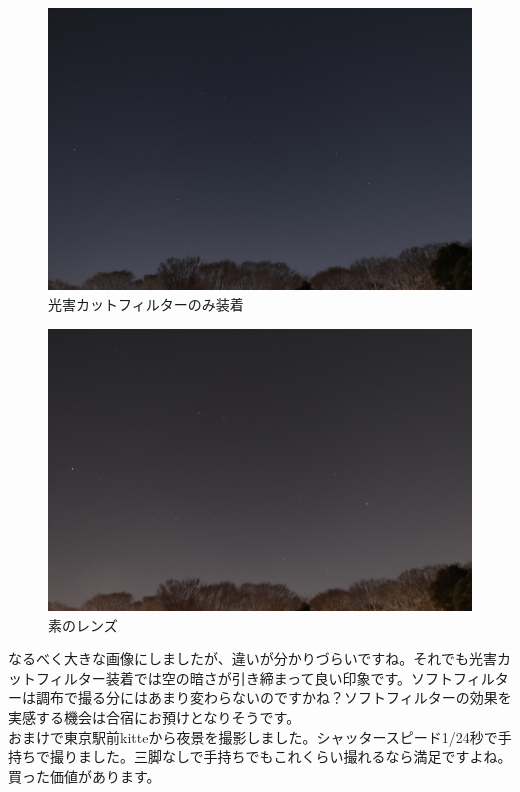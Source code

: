 \documentclass[a4paper.10pt]{jarticle}
\begin{document}
\begin{figure}[H]
	\begin{center}
		\includegraphics[width=14cm]{cut.jpg}
		\caption{光害カットフィルターのみ装着}
		\label{}
	\end{center}
\end{figure}
\begin{figure}[H]
	\begin{center}
		\includegraphics[width=14cm]{normal.jpg}
		\caption{素のレンズ}
		\label{}
	\end{center}
\end{figure}
なるべく大きな画像にしましたが、違いが分かりづらいですね。それでも光害カットフィルター装着では空の暗さが引き締まって良い印象です。ソフトフィルターは調布で撮る分にはあまり変わらないのですかね？ソフトフィルターの効果を実感する機会は合宿にお預けとなりそうです。\\
おまけで東京駅前kitteから夜景を撮影しました。シャッタースピード1/24秒で手持ちで撮りました。三脚なしで手持ちでもこれくらい撮れるなら満足ですよね。買った価値があります。
\end{document}
